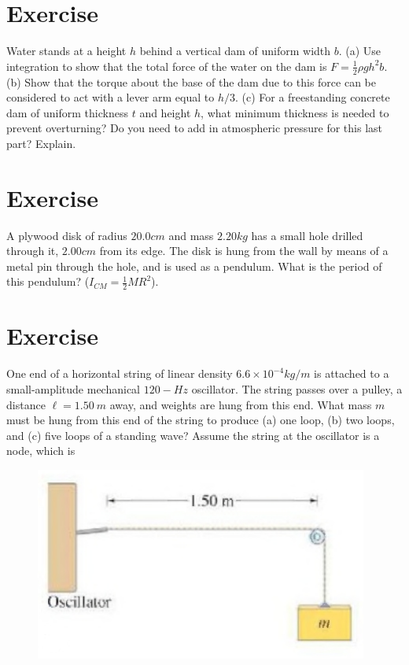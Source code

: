 \documentclass[12pt]{article}
\begin{document}

\section*{Exercise \theexample}

Water stands at a height $h$ behind a vertical dam of
uniform width $b$. (a) Use integration to show that the total
force of the water on the dam is $F=\frac{1}{2}\rho g h^2 b$. (b) Show
that the torque about the base of the dam due to this force
can be considered to act with a lever arm equal to $h/3$.
(c) For a freestanding concrete dam of uniform thickness $t$ and
height $h$, what minimum thickness is needed to prevent
overturning? Do you need to add in atmospheric pressure
for this last part? Explain.



\section*{Exercise \theexample}

A plywood disk of radius $20.0 cm$ and mass $2.20 kg$
has a small hole drilled through
it, $2.00 cm$ from its edge. The disk is hung
from the wall by means of a
metal pin through the hole, and
is used as a pendulum. What is
the period of this pendulum? ($I_{CM}=\frac{1}{2}MR^2$).



\section*{Exercise \theexample}


One end of a horizontal string of linear density
$6.6 \times 10^{-4} kg/m$ is attached to a small-amplitude mechanical
$120-Hz$ oscillator. The string passes over a pulley, a
distance $\ell = 1.50 ~m$ away, and weights are hung from this
end. What mass $m$ must be hung from this end of
the string to produce (a) one loop, (b) two loops, and
(c) five loops of a standing wave? Assume the string at the
oscillator is a node, which is


\begin{figure}[h!]
  \begin{center}
    \includegraphics[height=2.5in]{images/2.jpg}
  \end{center}
\end{figure}
\end{document}
